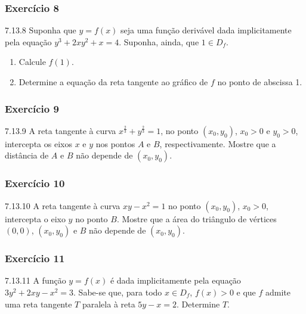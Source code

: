 \subsubsection*{Exercício 8}
\begin{exercicio}[8]{7.13.8}
Suponha que $y = f(x)$ seja uma função derivável dada implicitamente pela equação $y^3 + 2xy^2 + x = 4$. Suponha, ainda, que $1 \in D_f$.
\begin{enumerate}[label=\alph*)]
    \item Calcule $f(1)$.
    \item Determine a equação da reta tangente ao gráfico de $f$ no ponto de abscissa 1.
\end{enumerate}
\end{exercicio}

\subsubsection*{Exercício 9}
\begin{exercicio}[9]{7.13.9}
A reta tangente à curva $x^{\frac{2}{3}} + y^{\frac{2}{3}} = 1$, no ponto $(x_0, y_0)$, $x_0 > 0$ e $y_0 > 0$, intercepta os eixos $x$ e $y$ nos pontos $A$ e $B$, respectivamente. Mostre que a distância de $A$ e $B$ não depende de $(x_0, y_0)$.
\end{exercicio}

\subsubsection*{Exercício 10}
\begin{exercicio}[10]{7.13.10}
A reta tangente à curva $xy - x^2 = 1$ no ponto $(x_0, y_0)$, $x_0 > 0$, intercepta o eixo $y$ no ponto $B$. Mostre que a área do triângulo de vértices $(0,0)$, $(x_0, y_0)$ e $B$ não depende de $(x_0, y_0)$.
\end{exercicio}

\subsubsection*{Exercício 11}
\begin{exercicio}[11]{7.13.11}
A função $y = f(x)$ é dada implicitamente pela equação $3y^2 + 2xy - x^2 = 3$. Sabe-se que, para todo $x \in D_f$, $f(x) > 0$ e que $f$ admite uma reta tangente $T$ paralela à reta $5y - x = 2$. Determine $T$.
\end{exercicio}

\clearpage

